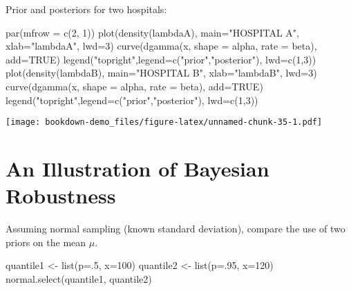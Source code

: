 \documentclass[
]{book}
\newenvironment{Shaded}{\begin{snugshade}}{\end{snugshade}}
\newcommand{\AttributeTok}[1]{\textcolor[rgb]{0.77,0.63,0.00}{#1}}
\newcommand{\ConstantTok}[1]{\textcolor[rgb]{0.00,0.00,0.00}{#1}}
\newcommand{\DecValTok}[1]{\textcolor[rgb]{0.00,0.00,0.81}{#1}}
\newcommand{\FunctionTok}[1]{\textcolor[rgb]{0.00,0.00,0.00}{#1}}
\newcommand{\NormalTok}[1]{#1}
\newcommand{\OtherTok}[1]{\textcolor[rgb]{0.56,0.35,0.01}{#1}}
\newcommand{\StringTok}[1]{\textcolor[rgb]{0.31,0.60,0.02}{#1}}
\begin{document}
Prior and posteriors for two hospitals:

\begin{Shaded}
\begin{Highlighting}[]
\FunctionTok{par}\NormalTok{(}\AttributeTok{mfrow =} \FunctionTok{c}\NormalTok{(}\DecValTok{2}\NormalTok{, }\DecValTok{1}\NormalTok{))}
 \FunctionTok{plot}\NormalTok{(}\FunctionTok{density}\NormalTok{(lambdaA), }\AttributeTok{main=}\StringTok{"HOSPITAL A"}\NormalTok{,}
      \AttributeTok{xlab=}\StringTok{"lambdaA"}\NormalTok{, }\AttributeTok{lwd=}\DecValTok{3}\NormalTok{)}
 \FunctionTok{curve}\NormalTok{(}\FunctionTok{dgamma}\NormalTok{(x, }\AttributeTok{shape =}\NormalTok{ alpha, }\AttributeTok{rate =}\NormalTok{ beta),}
       \AttributeTok{add=}\ConstantTok{TRUE}\NormalTok{)}
 \FunctionTok{legend}\NormalTok{(}\StringTok{"topright"}\NormalTok{,}\AttributeTok{legend=}\FunctionTok{c}\NormalTok{(}\StringTok{"prior"}\NormalTok{,}\StringTok{"posterior"}\NormalTok{),}
        \AttributeTok{lwd=}\FunctionTok{c}\NormalTok{(}\DecValTok{1}\NormalTok{,}\DecValTok{3}\NormalTok{))}
 \FunctionTok{plot}\NormalTok{(}\FunctionTok{density}\NormalTok{(lambdaB), }\AttributeTok{main=}\StringTok{"HOSPITAL B"}\NormalTok{,}
      \AttributeTok{xlab=}\StringTok{"lambdaB"}\NormalTok{, }\AttributeTok{lwd=}\DecValTok{3}\NormalTok{)}
 \FunctionTok{curve}\NormalTok{(}\FunctionTok{dgamma}\NormalTok{(x, }\AttributeTok{shape =}\NormalTok{ alpha, }\AttributeTok{rate =}\NormalTok{ beta),}
       \AttributeTok{add=}\ConstantTok{TRUE}\NormalTok{)}
 \FunctionTok{legend}\NormalTok{(}\StringTok{"topright"}\NormalTok{,}\AttributeTok{legend=}\FunctionTok{c}\NormalTok{(}\StringTok{"prior"}\NormalTok{,}\StringTok{"posterior"}\NormalTok{),}
        \AttributeTok{lwd=}\FunctionTok{c}\NormalTok{(}\DecValTok{1}\NormalTok{,}\DecValTok{3}\NormalTok{))}
\end{Highlighting}
\end{Shaded}

\texttt{[image: bookdown-demo\_files/figure-latex/unnamed-chunk-35-1.pdf]}

\hypertarget{an-illustration-of-bayesian-robustness}{%
\section{An Illustration of Bayesian Robustness}\label{an-illustration-of-bayesian-robustness}}

Assuming normal sampling (known standard deviation), compare the use of two priors on the mean \(\mu\).

\begin{Shaded}
\begin{Highlighting}[]
\NormalTok{quantile1 }\OtherTok{\textless{}{-}} \FunctionTok{list}\NormalTok{(}\AttributeTok{p=}\NormalTok{.}\DecValTok{5}\NormalTok{, }\AttributeTok{x=}\DecValTok{100}\NormalTok{)}
\NormalTok{quantile2 }\OtherTok{\textless{}{-}} \FunctionTok{list}\NormalTok{(}\AttributeTok{p=}\NormalTok{.}\DecValTok{95}\NormalTok{, }\AttributeTok{x=}\DecValTok{120}\NormalTok{)}
\FunctionTok{normal.select}\NormalTok{(quantile1, quantile2)}
\end{Highlighting}
\end{Shaded}
\end{document}
